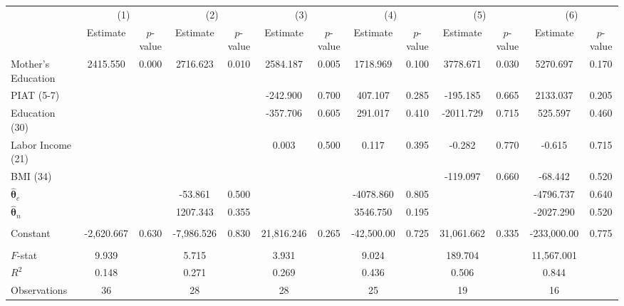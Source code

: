 \begin{tabular}{lcccccccccccc} \toprule
 & \multicolumn{2}{c}{(1)}  &  \multicolumn{2}{c}{(2)}  &  \multicolumn{2}{c}{(3)}  &  \multicolumn{2}{c}{(4)}  & \multicolumn{2}{c}{(5)} & \multicolumn{2}{c}{(6)} \\  
 & Estimate & $p$-value & Estimate & $p$-value & Estimate & $p$-value & Estimate & $p$-value & Estimate & $p$-value & Estimate & $p$-value \\ \midrule
Mother's Education &  2415.550 &     0.000 &  2716.623 &     0.010 &  2584.187 &     0.005 &  1718.969 &     0.100 &  3778.671 &     0.030 &  5270.697 &     0.170 \\  
PIAT (5-7) &         &         &         &         &  -242.900 &     0.700 &   407.107 &     0.285 &  -195.185 &     0.665 &  2133.037 &     0.205 \\  
Education (30) &         &         &         &         &  -357.706 &     0.605 &   291.017 &     0.410 & -2011.729 &     0.715 &   525.597 &     0.460 \\  
Labor Income (21) &         &         &         &         &     0.003 &     0.500 &     0.117 &     0.395 &    -0.282 &     0.770 &    -0.615 &     0.715 \\  
BMI (34) &         &         &         &         &         &         &         &         &  -119.097 &     0.660 &   -68.442 &     0.520 \\  
$\hat{\bm{\theta}}_c$ &         &         &   -53.861 &     0.500 &         &         & -4078.860 &     0.805 &         &         & -4796.737 &     0.640 \\  
$\hat{\bm{\theta}}_n$ &         &         &  1207.343 &     0.355 &         &         &  3546.750 &     0.195 &         &         & -2027.290 &     0.520 \\  \\
Constant  & -2,620.667 &     0.630 & -7,986.526 &     0.830 & 21,816.246 &     0.265 & -42,500.00 &     0.725 & 31,061.662 &     0.335 & -233,000.00 &     0.775 \\  \\ \midrule
$F$-stat &     9.939 &      &     5.715 &     &     3.931 &     &     9.024 &    &   189.704 &     & 11,567.001 &     \\  
$R^2$ &     0.148 &     &     0.271 &    &     0.269 &      &     0.436 &     &     0.506 &      &     0.844 &    \\  
Observations &    36 &   &    28 &    &    28 &   &    25 &   &    19 &  &    16 &   \\  
\bottomrule \end{tabular}
